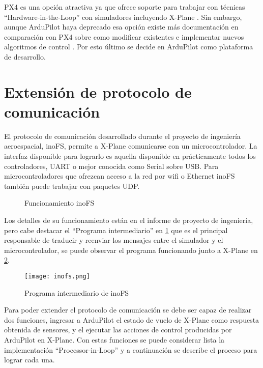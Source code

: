 PX4 es una opción atractiva ya que ofrece soporte para trabajar con técnicas ``Hardware-in-the-Loop'' con simuladores incluyendo X-Plane \cite{px4-hitl}. Sin embargo, aunque ArduPilot haya deprecado esa opción \cite{ap-hitl} existe más documentación en comparación con PX4 sobre como modificar existentes e implementar nuevos algoritmos de control \cite{ap-custom-controller}. Por esto último se decide en ArduPilot como plataforma de desarrollo.

\section{Extensión de protocolo de comunicación}

El protocolo de comunicación desarrollado durante el proyecto de ingeniería aeroespacial, inoFS, permite a X-Plane comunicarse con un microcontrolador. La interfaz disponible para lograrlo es aquella disponible en prácticamente todos los controladores, UART o mejor conocida como Serial sobre USB. Para microcontroladores que ofrezcan acceso a la red por wifi o Ethernet inoFS también puede trabajar con paquetes UDP.

\begin{figure}[h]
    \centering
    
    \caption{Funcionamiento inoFS}
    \label{fig:inofs-diagrama}
\end{figure}

Los detalles de su funcionamiento están en el informe de proyecto de ingeniería, pero cabe destacar el ``Programa intermediario'' en \cref{fig:inofs-diagrama} que es el principal responsable de traducir y reenviar los mensajes entre el simulador y el microcontrolador, se puede observar el programa funcionando junto a X-Plane en \cref{fig:inofs-programa-intermediario}.

\begin{figure}[h]
    \centering
    \texttt{[image: inofs.png]}
    \caption{Programa intermediario de inoFS}
    \label{fig:inofs-programa-intermediario}
\end{figure}

Para poder extender el protocolo de comunicación se debe ser capaz de realizar dos funciones, ingresar a ArduPilot el estado de vuelo de X-Plane como respuesta obtenida de sensores, y el ejecutar las acciones de control producidas por ArduPilot en X-Plane. Con estas funciones se puede considerar lista la implementación ``Processor-in-Loop'' y a continuación se describe el proceso para lograr cada una.

